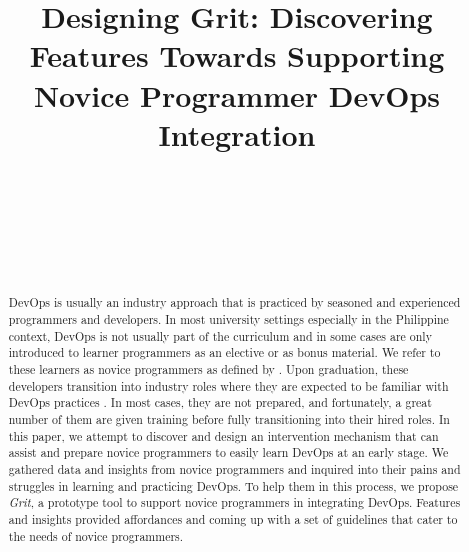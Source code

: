 \documentclass{sigchi}
\def\plaintitle{Designing Grit: Discovering Features Towards Supporting Novice Programmer DevOps Integration}
\begin{document}
\title{\plaintitle}
\author{%
  \\
  \\
 \\
\\
\\
}
\maketitle
\begin{abstract}
DevOps is usually an industry approach that is practiced by seasoned and experienced programmers and developers. In most university settings especially in the Philippine context, DevOps is not usually part of the curriculum and in some cases are only introduced to learner programmers as an elective or as bonus material. We refer to these learners as novice programmers as defined by \cite{mccarthygame}. Upon graduation, these developers transition into industry roles where they are expected to be familiar with DevOps practices \cite{scaffidi2018employers}. In most cases, they are not prepared, and fortunately, a great number of them are given training before fully transitioning into their hired roles. In this paper, we attempt to discover and design an intervention mechanism that can assist and prepare novice programmers to easily learn DevOps at an early stage. We gathered data and insights from novice programmers and inquired into their pains and struggles in learning and practicing DevOps. To help them in this process, we propose \textit{Grit}, a prototype tool to support novice programmers in integrating DevOps. Features and insights provided affordances and coming up with a set of guidelines that cater to the needs of novice programmers. 
\end{abstract}
\end{document}
